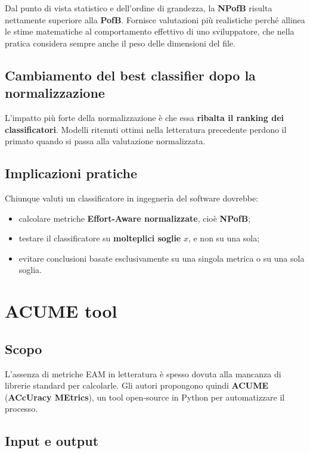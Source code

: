 Dal punto di vista statistico e dell'ordine di grandezza, la \textbf{NPofB} risulta nettamente superiore alla \textbf{PofB}. Fornisce valutazioni più realistiche perché allinea le stime matematiche al comportamento effettivo di uno sviluppatore, che nella pratica considera sempre anche il peso delle dimensioni del file.

\subsection{Cambiamento del best classifier dopo la normalizzazione}

L'impatto più forte della normalizzazione è che essa \textbf{ribalta il ranking dei classificatori}. Modelli ritenuti ottimi nella letteratura precedente perdono il primato quando si passa alla valutazione normalizzata.

\subsection{Implicazioni pratiche}

Chiunque valuti un classificatore in ingegneria del software dovrebbe:
\begin{itemize}
    \item calcolare metriche \textbf{Effort-Aware normalizzate}, cioè \textbf{NPofB};
    \item testare il classificatore su \textbf{molteplici soglie} \(x\), e non su una sola;
    \item evitare conclusioni basate esclusivamente su una singola metrica o su una sola soglia.
\end{itemize}

\section{ACUME tool}

\subsection{Scopo}

L'assenza di metriche EAM in letteratura è spesso dovuta alla mancanza di librerie standard per calcolarle. Gli autori propongono quindi \textbf{ACUME} (\textbf{ACcUracy MEtrics}), un tool open-source in Python per automatizzare il processo.

\subsection{Input e output}

